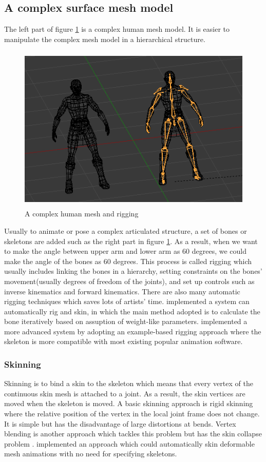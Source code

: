 \subsection{A complex surface mesh model}
The left part of figure \ref{fig:rigging} is a complex human mesh model. It is easier to manipulate the complex mesh model in a hierarchical structure.
\begin{figure}[ht!]
\centering
\includegraphics[height=8cm]{figures/rigging.png}
\caption{A complex human mesh and rigging \protect\cite{shaolinpic}}
\label{fig:rigging}
\end{figure}
Usually to animate or pose a complex articulated structure, a set of
bones or skeletons are added such as the right part in figure \ref{fig:rigging}.  As a result, when we want to make the angle between 
upper arm and lower arm as 60 degrees, we could make the angle of the bones as 60 degrees.
This process is called rigging which
usually includes linking the bones in a hierarchy,
setting constraints on the bones' movement(usually degrees of freedom
of the joints), and set up controls such
as inverse kinematics and forward kinematics.
There are also many automatic rigging techniques which saves lots of
artists' time. \cite{Rigging1} implemented a system can automatically rig and skin, in which the main method adopted is to calculate the bone iteratively based on assuption of weight-like parameters.  \cite{Rigging2}  implemented a more advanced system by adopting an example-based rigging approach where the skeleton is more compatible with most existing popular animation software.
\subsubsection{Skinning}
Skinning is to bind a skin to the skeleton which means that every
vertex of the continuous skin mesh is attached to a joint. As a
result, the skin vertices are moved when the skeleton is moved.
A basic skinning approach is rigid skinning where the relative
position of the vertex in the local joint frame does not change. It is simple but has the disadvantage
of large distortions at bends. Vertex blending is another approach
which tackles this problem but has the skin collapse problem
\cite{skinning1}. \cite{skinning2} implemented an approach which could
automatically skin deformable mesh animations with no need for
specifying skeletons.
